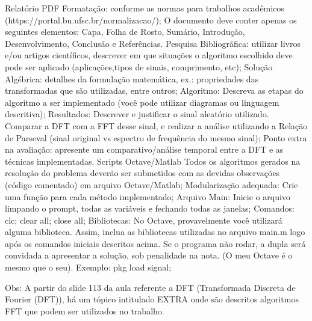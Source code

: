     Relatório PDF
        Formatação: conforme as normas para trabalhos acadêmicos (https://portal.bu.ufsc.br/normalizacao/);
            O documento deve conter apenas os seguintes elementos: Capa, Folha de Rosto, Sumário, Introdução, Desenvolvimento, Conclusão e Referências.
        Pesquisa Bibliográfica: utilizar livros e/ou artigos científicos, descrever em que situações o algoritmo escolhido deve pode ser aplicado (aplicações,tipos de sinais, comprimento, etc);
        Solução Algébrica: detalhes da formulação matemática, ex.: propriedades das transformadas que são utilizadas, entre outros;
        Algoritmo: Descreva as etapas do algoritmo a ser implementado (você pode utilizar diagramas ou linguagem descritiva);
        Resultados: Descrever e justificar o sinal aleatório utilizado. Comparar a DFT com a FFT desse sinal, e realizar a análise utilizando a Relação de Parseval (sinal original vs espectro de frequência do mesmo sinal);
        Ponto extra na avaliação: apresente um comparativo/análise temporal entre a DFT e as técnicas implementadas.
    Scripts Octave/Matlab 
        Todos os algoritmos gerados na resolução do problema deverão ser submetidos com as devidas observações (código comentado) em arquivo Octave/Matlab;
        Modularização adequada: Crie uma função para cada método implementado;
        Arquivo Main: Inicie o arquivo limpando o prompt, todas as variáveis e fechando todas as janelas;
            Comandos: clc; clear all; close all;
        Bibliotecas: No Octave, provavelmente você utilizará alguma biblioteca. Assim, inclua as bibliotecas utilizadas no arquivo 
        main.m 
        logo após os comandos iniciais descritos acima. Se o programa não rodar, a dupla será convidada a apresentar a solução, sob penalidade na nota. (O meu Octave é o mesmo que o seu). Exemplo:
            pkg load signal;

Obs: A partir do slide 113 da aula referente a DFT (Transformada Discreta de Fourier (DFT)), há um tópico intitulado EXTRA onde são descritos algoritmos FFT que podem ser utilizados no trabalho.




